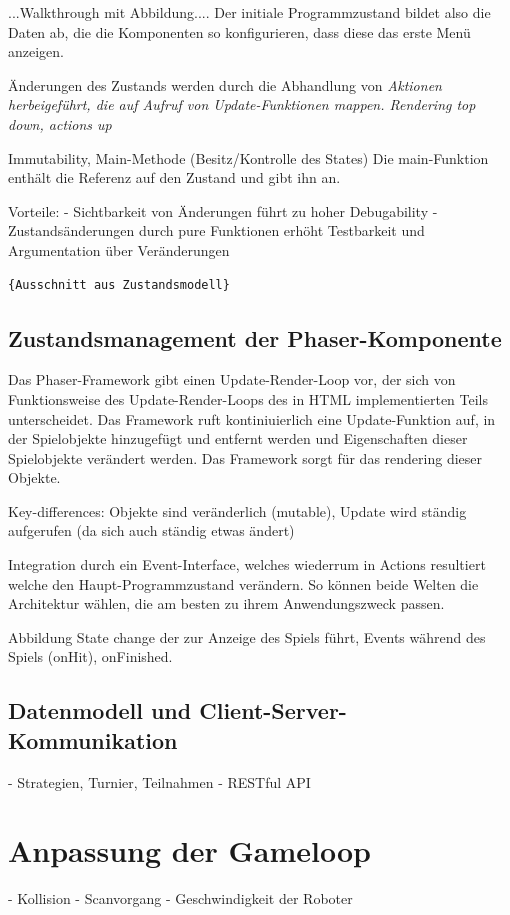...Walkthrough mit Abbildung.... Der initiale Programmzustand bildet also die Daten ab, die die
Komponenten so konfigurieren, dass diese das erste Menü anzeigen.

Änderungen des Zustands werden durch die Abhandlung von \em{Aktionen} herbeigeführt, die auf Aufruf
von Update-Funktionen mappen. Rendering top down, actions up

Immutability, Main-Methode (Besitz/Kontrolle des States) Die main-Funktion enthält die Referenz auf
den Zustand und gibt ihn an.

Vorteile: - Sichtbarkeit von Änderungen führt zu hoher Debugability - Zustandsänderungen durch pure
Funktionen erhöht Testbarkeit und Argumentation über Veränderungen


\begin{lstlisting}{Ausschnitt aus Zustandsmodell} \end{lstlisting}

\subsection{Zustandsmanagement der Phaser-Komponente}

Das Phaser-Framework gibt einen Update-Render-Loop vor, der sich von Funktionsweise des
Update-Render-Loops des in HTML implementierten Teils unterscheidet. Das Framework ruft
kontiniuierlich eine Update-Funktion auf, in der Spielobjekte hinzugefügt und entfernt werden und
Eigenschaften dieser Spielobjekte verändert werden. Das Framework sorgt für das rendering dieser
Objekte.

Key-differences: Objekte sind veränderlich (mutable), Update wird ständig aufgerufen (da sich auch
ständig etwas ändert)

Integration durch ein Event-Interface, welches wiederrum in Actions resultiert welche den
Haupt-Programmzustand verändern. So können beide Welten die Architektur wählen, die am besten zu
ihrem Anwendungszweck passen.

Abbildung State change der zur Anzeige des Spiels führt, Events während des Spiels (onHit),
onFinished.


\subsection{Datenmodell und Client-Server-Kommunikation}

- Strategien, Turnier, Teilnahmen - RESTful API

\section{Anpassung der Gameloop}

- Kollision - Scanvorgang - Geschwindigkeit der Roboter

